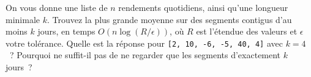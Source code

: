 \begin{question}\label{iq:iv3:algorithms:80}
On vous donne une liste de $n$ rendements quotidiens, ainsi qu'une longueur minimale $k$. Trouvez la plus grande moyenne sur des segments contigus d'au moins $k$ jours, en temps $O(n \log(R/\epsilon))$, où $R$ est l'étendue des valeurs et $\epsilon$ votre tolérance. Quelle est la réponse pour \texttt{[2, 10, -6, -5, 40, 4]} avec $k = 4$~? Pourquoi ne suffit-il pas de ne regarder que les segments d'exactement $k$ jours~?
\end{question}
